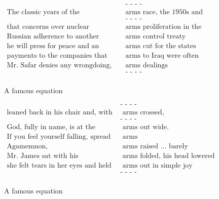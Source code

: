 \documentclass[a4paper,12pt,twoside,openright]{report}
\begin{document}
\begin{figure}[H]
\begin{align}
\text{                                                   } & \text{- - - -} \nonumber \\
                      \text{The classic years of the} & \text{arms race, the 1950s and ’60s before} \nonumber \\
                      \text{                                                   } & \text{- - - -} \nonumber \\
                    \text{that concerns over nuclear} & \text{arms proliferation in the Middle East} \nonumber \\
                  \text{Russian adherence to another} & \text{arms control treaty} \nonumber \\
       \text{he will press for peace and an eventual} & \text{arms cut for the states} \nonumber \\
       \text{payments to the companies that supplied} & \text{arms to Iraq were often delayed} \nonumber \\
\text{Mr. Safar denies any wrongdoing, including any} & \text{arms dealings} \nonumber \\
\text{                                                   } & \text{- - - -} \nonumber \\
\end{align}
\caption{A famous equation}
\end{figure}



\begin{figure}[H]
\begin{align}
\text{                                              } & \text{- - - -} \nonumber \\
           \text{leaned back in his chair and, with} & \text{ arms crossed,} \nonumber \\
\text{                                              } & \text{- - - -} \nonumber \\
\text{God, fully in name, is at the bottom with his} & \text{ arms out wide.} \nonumber \\
    \text{If you feel yourself falling, spread your} & \text{ arms} \nonumber \\
                                   \text{Agamemnon,} & \text{ arms raised ... barely contained violence} \nonumber \\
                       \text{Mr. James sat with his} & \text{ arms folded, his head lowered} \nonumber \\
      \text{she felt tears in her eyes and held her} & \text{ arms out in simple joy} \nonumber \\
\text{                                             } & \text{- - - -} \nonumber \\
\end{align}
\caption{A famous equation}
\end{figure}
\end{document}

